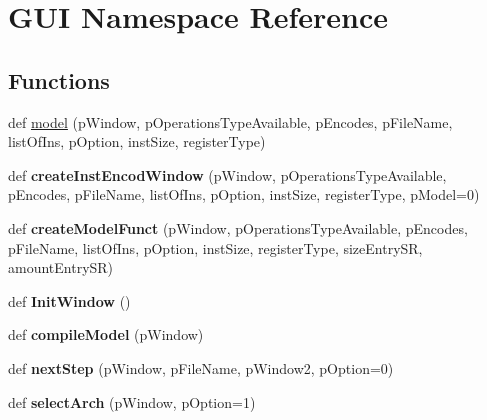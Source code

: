 \hypertarget{namespaceGUI}{}\section{G\+UI Namespace Reference}
\label{namespaceGUI}
\subsection*{Functions}
\begin{DoxyCompactItemize}
\item 
def \hyperlink{namespaceGUI_a39b331e3c587f04f1de3b38e4036cd7a}{model} (p\+Window, p\+Operations\+Type\+Available, p\+Encodes, p\+File\+Name, list\+Of\+Ins, p\+Option, inst\+Size, register\+Type)
\item 
def {\bfseries create\+Inst\+Encod\+Window} (p\+Window, p\+Operations\+Type\+Available, p\+Encodes, p\+File\+Name, list\+Of\+Ins, p\+Option, inst\+Size, register\+Type, p\+Model=0)\hypertarget{namespaceGUI_aa42f242763362c07e9a88e677b0d38fb}{}\label{namespaceGUI_aa42f242763362c07e9a88e677b0d38fb}

\item 
def {\bfseries create\+Model\+Funct} (p\+Window, p\+Operations\+Type\+Available, p\+Encodes, p\+File\+Name, list\+Of\+Ins, p\+Option, inst\+Size, register\+Type, size\+Entry\+SR, amount\+Entry\+SR)\hypertarget{namespaceGUI_a54125cf1f4a412f0a6dbf303b23e2590}{}\label{namespaceGUI_a54125cf1f4a412f0a6dbf303b23e2590}

\item 
def {\bfseries Init\+Window} ()\hypertarget{namespaceGUI_af2ea0391b39b65b6671fac759f87f4f4}{}\label{namespaceGUI_af2ea0391b39b65b6671fac759f87f4f4}

\item 
def {\bfseries compile\+Model} (p\+Window)\hypertarget{namespaceGUI_ae0c34a60a9565ec44a938068dca7f5fe}{}\label{namespaceGUI_ae0c34a60a9565ec44a938068dca7f5fe}

\item 
def {\bfseries next\+Step} (p\+Window, p\+File\+Name, p\+Window2, p\+Option=0)\hypertarget{namespaceGUI_a5cd85cef3afd14afacc997496afbe73a}{}\label{namespaceGUI_a5cd85cef3afd14afacc997496afbe73a}

\item 
def {\bfseries select\+Arch} (p\+Window, p\+Option=1)\hypertarget{namespaceGUI_abaccd21015bcd65dc28a16671c931d62}{}\label{namespaceGUI_abaccd21015bcd65dc28a16671c931d62}

\end{DoxyCompactItemize}
